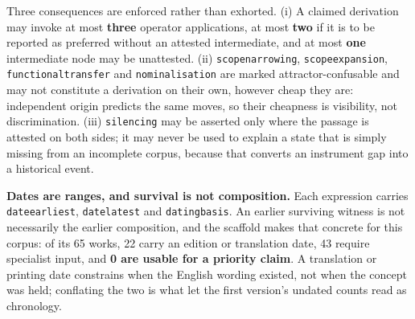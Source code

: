 \documentclass[11pt]{article}
\DeclareRobustCommand{\_}{\textunderscore\allowbreak}
\newcommand{\field}[1]{\texttt{\small #1}}
\begin{document}
Three consequences are enforced rather than exhorted. (i) A claimed derivation may
invoke at most \textbf{three} operator applications, at most \textbf{two} if it is
to be reported as preferred without an attested intermediate, and at most
\textbf{one} intermediate node may be unattested. (ii)
\texttt{scope\_narrowing}, \texttt{scope\_expansion}, \texttt{functional\_transfer}
and \texttt{nominalisation} are marked attractor-confusable and may not
constitute a derivation on their own, however cheap they are: independent origin
predicts the same moves, so their cheapness is visibility, not discrimination.
(iii) \texttt{silencing} may be asserted only where the passage is attested on both
sides; it may never be used to explain a state that is simply missing from an
incomplete corpus, because that converts an instrument gap into a historical event.

\textbf{Dates are ranges, and survival is not composition.} Each expression
carries \field{date\_earliest}, \field{date\_latest} and \field{dating\_basis}. An
earlier surviving witness is not necessarily the earlier composition, and the
scaffold makes that concrete for this corpus: of its 65 works, 22 carry an edition
or translation date, 43 require specialist input, and \textbf{0 are usable for a
priority claim}. A translation or printing date constrains when the English
wording existed, not when the concept was held; conflating the two is what let the
first version's undated counts read as chronology.
\end{document}
